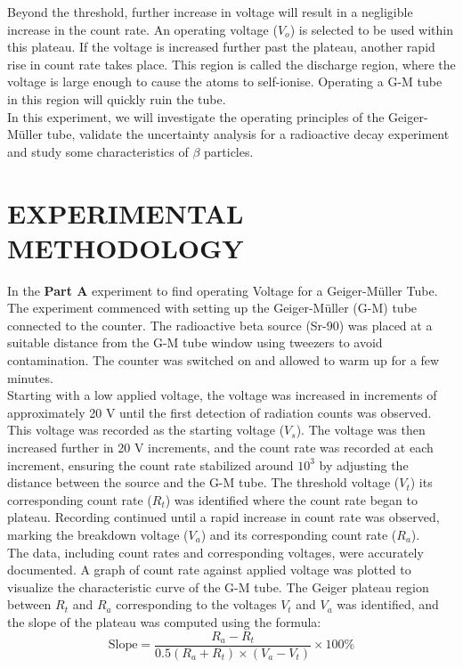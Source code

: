 \documentclass[a4paper,11pt]{article}
\begin{document}
Beyond the threshold, further increase in voltage will result in a negligible increase in the count rate. An operating voltage ($V_o$) is selected to be used within this plateau. If the voltage is increased further past the plateau, another rapid rise in count rate takes place. This region is called the discharge region, where the voltage is large enough to cause the atoms to self-ionise. Operating a G-M tube in this region will quickly ruin the tube.\\

In this experiment, we will investigate the operating principles of the Geiger-Müller tube, validate the uncertainty analysis for a radioactive decay experiment and study some characteristics of $\beta$ particles.

\newpage
{}
\section*{\center EXPERIMENTAL METHODOLOGY}
\label{sec:EXPERIMENTAL METHODOLOGY}
\qquad In the \textbf{Part A} experiment to find operating Voltage for a Geiger-Müller Tube. The experiment commenced with setting up the Geiger-Müller (G-M) tube connected to the counter. The radioactive beta source (Sr-90) was placed at a suitable distance from the G-M tube window using tweezers to avoid contamination. The counter was switched on and allowed to warm up for a few minutes.\\

Starting with a low applied voltage, the voltage was increased in increments of approximately 20 V until the first detection of radiation counts was observed. This voltage was recorded as the starting voltage (\(V_s\)). The voltage was then increased further in 20 V increments, and the count rate was recorded at each increment, ensuring the count rate stabilized around \(10^3\) by adjusting the distance between the source and the G-M tube. The threshold voltage (\(V_t\)) its corresponding count rate (\(R_t\)) was identified where the count rate began to plateau. Recording continued until a rapid increase in count rate was observed, marking the breakdown voltage (\(V_a\)) and its corresponding count rate (\(R_a\)).\\

The data, including count rates and corresponding voltages, were accurately documented. A graph of count rate against applied voltage was plotted to visualize the characteristic curve of the G-M tube. The Geiger plateau region between \(R_t\) and \(R_a\) corresponding to the voltages \(V_t\) and \(V_a\) was identified, and the slope of the plateau was computed using the formula:
\[
\text{Slope} = \frac{R_a - R_t}{0.5(R_a + R_t) \times (V_a - V_t)} \times 100\%
\]
\end{document}
